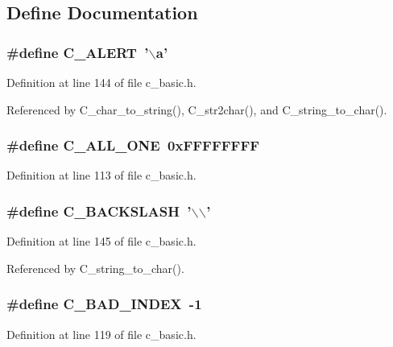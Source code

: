 \subsection{Define Documentation}
\subsubsection{\setlength{\rightskip}{0pt plus 5cm}\#define C\_\-ALERT~'$\backslash$a'}\label{c__basic_8h_298490455908f9b6fac24bddc22c3511}




Definition at line 144 of file c\_\-basic.h.

Referenced by C\_\-char\_\-to\_\-string(), C\_\-str2char(), and C\_\-string\_\-to\_\-char().
\subsubsection{\setlength{\rightskip}{0pt plus 5cm}\#define C\_\-ALL\_\-ONE~0x\-FFFFFFFF}\label{c__basic_8h_014f7a67a5a98a67995546c33313d660}




Definition at line 113 of file c\_\-basic.h.
\subsubsection{\setlength{\rightskip}{0pt plus 5cm}\#define C\_\-BACKSLASH~'$\backslash$$\backslash$'}\label{c__basic_8h_728a12e138fe3c6b682edcb0d0e308a7}




Definition at line 145 of file c\_\-basic.h.

Referenced by C\_\-string\_\-to\_\-char().
\subsubsection{\setlength{\rightskip}{0pt plus 5cm}\#define C\_\-BAD\_\-INDEX~-1}\label{c__basic_8h_3a94b19691217bd156c2a6802735a737}




Definition at line 119 of file c\_\-basic.h.

